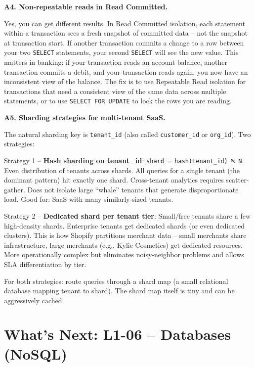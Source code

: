 \documentclass[11pt,a4paper]{article}
\begin{document}
\begin{answerbox}
\vspace{8pt}
\textbf{A4. Non-repeatable reads in Read Committed.}

Yes, you can get different results. In Read Committed isolation, each statement within a transaction sees a fresh snapshot of committed data -- not the snapshot at transaction start. If another transaction commits a change to a row between your two \texttt{SELECT} statements, your second \texttt{SELECT} will see the new value. This matters in banking: if your transaction reads an account balance, another transaction commits a debit, and your transaction reads again, you now have an inconsistent view of the balance. The fix is to use Repeatable Read isolation for transactions that need a consistent view of the same data across multiple statements, or to use \texttt{SELECT FOR UPDATE} to lock the rows you are reading.

\vspace{8pt}
\textbf{A5. Sharding strategies for multi-tenant SaaS.}

The natural sharding key is \texttt{tenant\_id} (also called \texttt{customer\_id} or \texttt{org\_id}). Two strategies:

Strategy 1 -- \textbf{Hash sharding on tenant\_id}: \texttt{shard = hash(tenant\_id) \% N}. Even distribution of tenants across shards. All queries for a single tenant (the dominant pattern) hit exactly one shard. Cross-tenant analytics requires scatter-gather. Does not isolate large ``whale'' tenants that generate disproportionate load. Good for: SaaS with many similarly-sized tenants.

Strategy 2 -- \textbf{Dedicated shard per tenant tier}: Small/free tenants share a few high-density shards. Enterprise tenants get dedicated shards (or even dedicated clusters). This is how Shopify partitions merchant data -- small merchants share infrastructure, large merchants (e.g., Kylie Cosmetics) get dedicated resources. More operationally complex but eliminates noisy-neighbor problems and allows SLA differentiation by tier.

For both strategies: route queries through a shard map (a small relational database mapping tenant to shard). The shard map itself is tiny and can be aggressively cached.
\end{answerbox}

\newpage

\section{What's Next: L1-06 -- Databases (NoSQL)}
\end{document}

